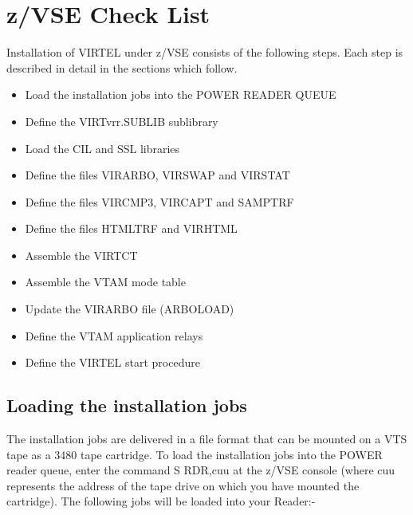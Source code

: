 \documentclass[letterpaper,10pt,english]{sphinxmanual}
\begin{document}
\section{z/VSE Check List}
\label{\detokenize{Installation_Guide:z-vse-check-list}}\label{\detokenize{Installation_Guide:index-17}}
Installation of VIRTEL under z/VSE consists of the following steps. Each step is described in detail in the sections which follow.
\begin{itemize}
\item {} 
Load the installation jobs into the POWER READER QUEUE

\item {} 
Define the VIRTvrr.SUBLIB sublibrary

\item {} 
Load the CIL and SSL libraries

\item {} 
Define the files VIRARBO, VIRSWAP and VIRSTAT

\item {} 
Define the files VIRCMP3, VIRCAPT and SAMPTRF

\item {} 
Define the files HTMLTRF and VIRHTML

\item {} 
Assemble the VIRTCT

\item {} 
Assemble the VTAM mode table

\item {} 
Update the VIRARBO file (ARBOLOAD)

\item {} 
Define the VTAM application relays

\item {} 
Define the VIRTEL start procedure

\end{itemize}

\ignorespaces 

\subsection{Loading the installation jobs}
\label{\detokenize{Installation_Guide:loading-the-installation-jobs}}\label{\detokenize{Installation_Guide:index-18}}
The installation jobs are delivered in a file format that can be mounted on a VTS tape as a 3480 tape cartridge. To load the installation jobs into the POWER reader queue, enter the command S RDR,cuu at the z/VSE console (where cuu represents the address of the tape drive on which you have mounted the cartridge). The following jobs will be loaded into your Reader:-
\end{document}
